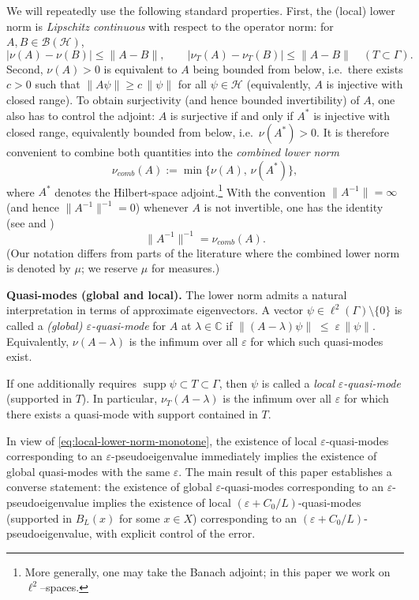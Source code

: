 \documentclass[11pt]{article}
\theoremstyle{definition}
\newcommand{\C}{\mathbb{C}}
\newcommand{\supp}{\operatorname{supp}}
\begin{document}
We will repeatedly use the following standard properties.  First, the (local) lower norm
is \emph{Lipschitz continuous} with respect to the operator norm: for
$A,B\in\mathcal B(\mathcal H)$,
\[
  |\nu(A)-\nu(B)|\le \|A-B\|,
  \qquad
  |\nu_T(A)-\nu_T(B)|\le \|A-B\|\quad(T\subset\Gamma).
\]
Second, $\nu(A)>0$ is equivalent to $A$ being bounded from below, i.e.\ there
exists $c>0$ such that $\|A\psi\|\ge c\,\|\psi\|$ for all $\psi\in\mathcal H$
(equivalently, $A$ is injective with closed range).  To obtain surjectivity (and hence bounded invertibility) of $A$, one also has
to control the adjoint: $A$ is surjective if and only if $A^*$ is injective
with closed range, equivalently bounded from below, i.e.\ $\nu(A^*)>0$.
It is therefore convenient to combine both quantities into the \emph{combined lower norm} 
\[ 
\nu_{comb}(A):=\min\{\nu(A),\,\nu(A^*)\}, 
\] 
where $A^*$ denotes the Hilbert-space adjoint.\footnote{More generally, one may take
the Banach adjoint; in this paper we work on $\ell^2$--spaces.}
With the convention $\|A^{-1}\|=\infty$
(and hence $\|A^{-1}\|^{-1}=0$) whenever $A$ is not invertible, one has the identity
(see \cite[Thm.~1.5.5]{Lindner2006} and \cite{Davies2007})
\begin{equation}
\label{eq: lower norm equals norm inverse}
  \|A^{-1}\|^{-1}=\nu_{comb}(A).
\end{equation}
(Our notation differs from parts of the literature where the combined lower norm is denoted by $\mu$; we reserve $\mu$ for measures.)

\medskip

\noindent
\textbf{Quasi-modes (global and local).}
The lower norm admits a natural interpretation in terms of approximate
eigenvectors. A vector $\psi\in \ell^2(\Gamma)\setminus\{0\}$ is called a
\emph{(global) $\varepsilon$-quasi-mode} for $A$ at $\lambda\in\C$ if $\|(A-\lambda)\psi\|\;\le\;\varepsilon\,\|\psi\|$.
Equivalently, $\nu(A-\lambda)$ is the infimum over all $\varepsilon$ for which such
quasi-modes exist.

If one additionally requires $\supp\psi\subset T\subset\Gamma$, then $\psi$ is
called a \emph{local $\varepsilon$-quasi-mode} (supported in $T$). In particular,
$\nu_T(A-\lambda)$ is the infimum over all $\varepsilon$ for which there exists a
quasi-mode with support contained in $T$.

In view of \eqref{eq:local-lower-norm-monotone}, the existence of local
$\varepsilon$-quasi-modes corresponding to an $\varepsilon$-pseudoeigenvalue immediately
implies the existence of global quasi-modes with the same $\varepsilon$.
The main result of this paper establishes a converse statement: the existence
of global $\varepsilon$-quasi-modes corresponding to an $\varepsilon$-pseudoeigenvalue
implies the existence of local $(\varepsilon + C_0/L)$-quasi-modes (supported in $B_L(x)$ for some
$x\in X$) corresponding to an $(\varepsilon + C_0/L)$-pseudoeigenvalue, with
explicit control of the error.
\end{document}
